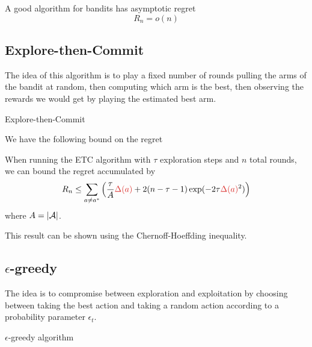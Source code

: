 \documentclass[../course-notes.tex]{subfiles}
\begin{document}
A good algorithm for bandits has asymptotic regret
\[
	R_n = o(n)
\]



\subsection{Explore-then-Commit}

The idea of this algorithm is to play a fixed number of rounds pulling the arms of the bandit at random, then computing which arm is the best, then observing the rewards we would get by playing the estimated best arm.


\begin{algorithm}\caption{Explore-then-Commit}
\end{algorithm}

We have the following bound on the regret

\begin{prop}
When running the ETC algorithm with $\tau$ exploration steps and $n$ total rounds, we can bound the regret accumulated by
\[
	R_n \leq \sum_{a\neq a^*}\left(
		\frac{\tau}{A}{\redfont\Delta(a)} + 2(n-\tau-1)\exp(-2\tau{\redfont\Delta(a)}^2)
	\right)
\]
where $A = |\mathcal{A}|$.
\end{prop}

This result can be shown using the Chernoff-Hoeffding inequality.


\subsection{\boldmath $\epsilon$-greedy}

The idea is to compromise between exploration and exploitation by choosing between taking the best action and taking a random action according to a probability parameter $\epsilon_t$.
\begin{algorithm}\caption{$\epsilon$-greedy algorithm}
\end{algorithm}
\end{document}
